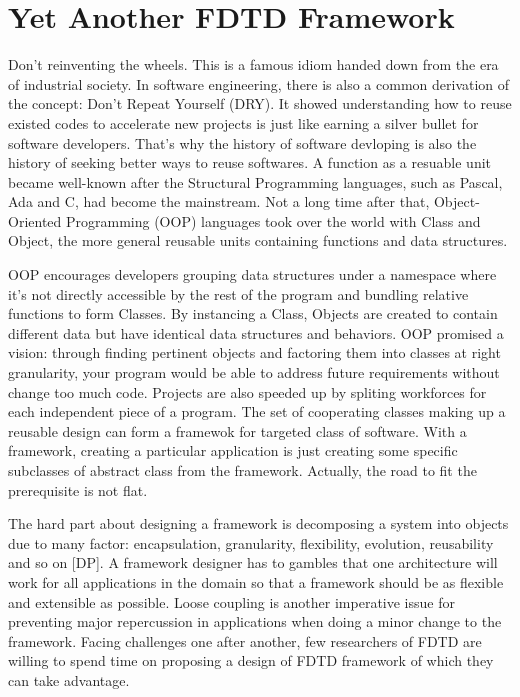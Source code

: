 \section{Yet Another FDTD Framework}

Don't reinventing the wheels. This is a famous idiom handed down from the era of industrial society. In software
engineering, there is also a common derivation of the concept: Don't Repeat Yourself (DRY). It showed understanding how
to reuse existed codes to accelerate new projects is just like earning a silver bullet for software developers. That's
why the history of software devloping is also the history of seeking better ways to reuse softwares. A function as a
resuable unit became well-known after the Structural Programming languages, such as Pascal, Ada and C, had become the
mainstream. Not a long time after that, Object-Oriented Programming (OOP) languages took over the world with Class and
Object, the more general reusable units containing functions and data structures.

OOP encourages developers grouping data structures under a namespace where it's not directly accessible by the rest of
the program and bundling relative functions to form Classes. By instancing a Class, Objects are created to contain
different data but have identical data structures and behaviors. OOP promised a vision: through finding pertinent
objects and factoring them into classes at right granularity, your program would be able to address future requirements
without change too much code. Projects are also speeded up by spliting workforces for each independent piece of a
program. The set of cooperating classes making up a reusable design can form a framewok for targeted class of
software. With a framework, creating a particular application is just creating some specific subclasses of abstract
class from the framework. Actually, the road to fit the prerequisite is not flat.

The hard part about designing a framework is decomposing a system into objects due to many factor: encapsulation,
granularity, flexibility, evolution, reusability and so on [DP]. A framework designer has to gambles that one
architecture will work for all applications in the domain so that a framework should be as flexible and extensible as
possible. Loose coupling is another imperative issue for preventing major repercussion in applications when doing a
minor change to the framework. Facing challenges one after another, few researchers of FDTD are willing to spend time
on proposing a design of FDTD framework of which they can take advantage.

